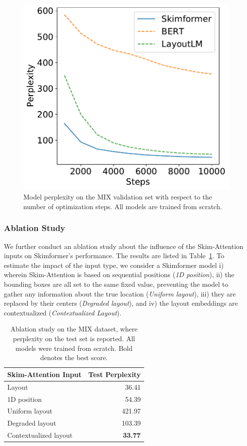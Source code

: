 \begin{figure}
    \centering \small
    \includegraphics[width=.4\textwidth]{images/chapter3/learning_curves-mix-steps10k-clean2.pdf}
    \caption{Model perplexity on the MIX validation set with respect to the number of optimization steps. All models are trained from scratch.}
    \label{fig:chapter3-pretraining-learning-curves}
\end{figure}

\subsubsection{Ablation Study}

We further conduct an ablation study about the influence of the Skim-Attention inputs on Skimformer's performance. The results are listed in Table~\ref{tab:chapter3-ablation-study}. To estimate the impact of the input type, we consider a Skimformer model i) wherein Skim-Attention is based on sequential positions (\textit{1D position}), ii) the bounding boxes are all set to the same fixed value, preventing the model to gather any information about the true location (\textit{Uniform layout}), iii) they are replaced by their centers (\textit{Degraded layout}), and iv) the layout embeddings are contextualized (\textit{Contextualized Layout}). 

\begin{table}[t]
\centering \small
\begin{tabular}{lr}
    \hline
    \textbf{Skim-Attention Input} & \textbf{Test Perplexity}\\
    \hline
    Layout                              & 36.41 \\
    1D position                         & 54.39 \\ 
    Uniform layout                      & 421.97 \\
    Degraded layout                     & 103.39 \\
    Contextualized layout               & \textbf{33.77} \\
    \hline
\end{tabular}
\caption{Ablation study on the MIX dataset, where perplexity on the test set is reported. All models were trained from scratch. Bold denotes the best score.}
\label{tab:chapter3-ablation-study}
\end{table}

